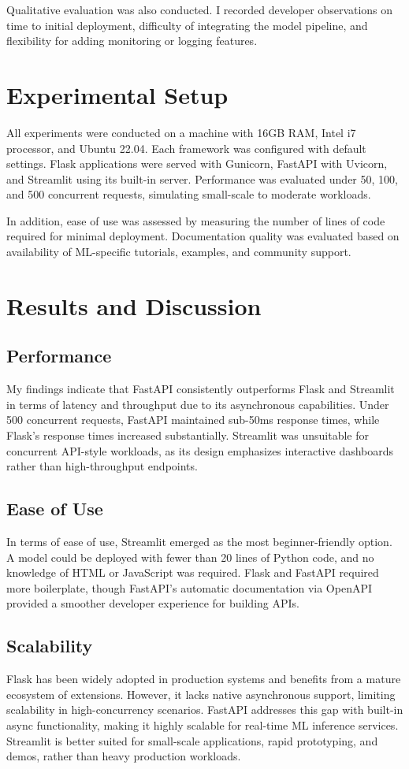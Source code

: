 \documentclass[12pt]{article}
\begin{document}
Qualitative evaluation was also conducted. I recorded developer observations on time to initial deployment, difficulty of integrating the model pipeline, and flexibility for adding monitoring or logging features.


\section{Experimental Setup}
All experiments were conducted on a machine with 16GB RAM, Intel i7 processor, and Ubuntu 22.04. Each framework was configured with default settings. Flask applications were served with Gunicorn, FastAPI with Uvicorn, and Streamlit using its built-in server. Performance was evaluated under 50, 100, and 500 concurrent requests, simulating small-scale to moderate workloads.

In addition, ease of use was assessed by measuring the number of lines of code required for minimal deployment. Documentation quality was evaluated based on availability of ML-specific tutorials, examples, and community support.


\section{Results and Discussion}
\subsection{Performance}
My findings indicate that FastAPI consistently outperforms Flask and Streamlit in terms of latency and throughput due to its asynchronous capabilities. Under 500 concurrent requests, FastAPI maintained sub-50ms response times, while Flask’s response times increased substantially. Streamlit was unsuitable for concurrent API-style workloads, as its design emphasizes interactive dashboards rather than high-throughput endpoints.

\subsection{Ease of Use}
In terms of ease of use, Streamlit emerged as the most beginner-friendly option. A model could be deployed with fewer than 20 lines of Python code, and no knowledge of HTML or JavaScript was required. Flask and FastAPI required more boilerplate, though FastAPI’s automatic documentation via OpenAPI provided a smoother developer experience for building APIs.

\subsection{Scalability}
Flask has been widely adopted in production systems and benefits from a mature ecosystem of extensions. However, it lacks native asynchronous support, limiting scalability in high-concurrency scenarios. FastAPI addresses this gap with built-in async functionality, making it highly scalable for real-time ML inference services. Streamlit is better suited for small-scale applications, rapid prototyping, and demos, rather than heavy production workloads.
\end{document}
